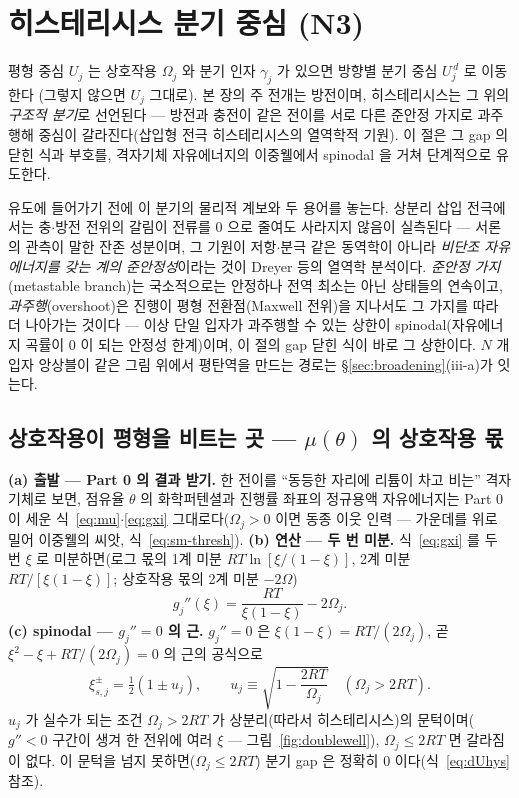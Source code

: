 \section{히스테리시스 분기 중심 (N3)}\label{sec:hys}
평형 중심 $U_j$ 는 상호작용 $\Omega_j$ 와 분기 인자 $\gamma_j$ 가 있으면 방향별 분기 중심 $U_j^{\,d}$ 로 이동한다
(그렇지 않으면 $U_j$ 그대로). 본 장의 주 전개는 방전이며, 히스테리시스는 그 위의 \emph{구조적 분기}로 선언된다 --- 방전과 충전이
같은 전이를 서로 다른 준안정 가지로 과주행해 중심이 갈라진다(삽입형 전극 히스테리시스의 열역학적 기원\cite{dreyer2010}).
이 절은 그 gap 의 닫힌 식과 부호를, 격자기체 자유에너지의
이중웰에서 spinodal 을 거쳐 단계적으로 유도한다.

유도에 들어가기 전에 이 분기의 물리적 계보와 두 용어를 놓는다. 상분리 삽입 전극에서는 충$\cdot$방전
전위의 갈림이 전류를 $0$ 으로 줄여도 사라지지 않음이 실측된다 --- 서론의 관측이 말한 잔존 성분이며, 그
기원이 저항$\cdot$분극 같은 동역학이 아니라 \emph{비단조 자유에너지를 갖는 계의 준안정성}이라는 것이
Dreyer 등의 열역학 분석이다\cite{dreyer2010,dreyer2011}. \emph{준안정 가지}(metastable branch)는
국소적으로는 안정하나 전역 최소는 아닌 상태들의 연속이고, \emph{과주행}(overshoot)은 진행이 평형
전환점(Maxwell 전위)을 지나서도 그 가지를 따라 더 나아가는 것이다 --- 이상 단일 입자가 과주행할 수 있는
상한이 spinodal(자유에너지 곡률이 $0$ 이 되는 안정성 한계)이며, 이 절의 gap 닫힌 식이 바로 그 상한이다.
$N$ 개 입자 앙상블이 같은 그림 위에서 평탄역을 만드는 경로는 \S\ref{sec:broadening}(iii-a)가 잇는다.

\subsection{상호작용이 평형을 비트는 곳 --- $\mu(\theta)$ 의 상호작용 몫}\label{sec:hys-spinodal}
\textbf{(a) 출발 --- Part 0 의 결과 받기.} 한 전이를 ``동등한 자리에 리튬이 차고 비는'' 격자기체로 보면,
점유율 $\theta$ 의 화학퍼텐셜과 진행률 좌표의 정규용액 자유에너지는 Part 0 이 세운
식~\eqref{eq:mu}$\cdot$\eqref{eq:gxi} 그대로다($\Omega_j>0$ 이면 동종 이웃 인력 --- 가운데를 위로 밀어
이중웰의 씨앗, 식~\eqref{eq:sm-thresh}). \textbf{(b) 연산 --- 두 번 미분.}
식~\eqref{eq:gxi} 를 두 번 $\xi$ 로 미분하면(로그 몫의 1계 미분 $RT\ln[\xi/(1-\xi)]$, 2계 미분
$RT/[\xi(1-\xi)]$; 상호작용 몫의 2계 미분 $-2\Omega$)
\begin{equation}
g_j''(\xi)=\frac{RT}{\xi(1-\xi)}-2\Omega_j.
\label{eq:gpp}
\end{equation}
\textbf{(c) spinodal --- $g_j''=0$ 의 근.} $g_j''=0$ 은 $\xi(1-\xi)=RT/(2\Omega_j)$, 곧 $\xi^2-\xi+RT/(2\Omega_j)=0$
의 근의 공식으로
\begin{equation}
\xi_{s,j}^\pm=\tfrac12(1\pm u_j),\qquad
u_j\equiv\sqrt{1-\frac{2RT}{\Omega_j}}\quad(\Omega_j>2RT).
\label{eq:spinodal}
\end{equation}
$u_j$ 가 실수가 되는 조건 $\Omega_j>2RT$ 가 상분리(따라서 히스테리시스)의 문턱이며($g''<0$ 구간이 생겨 한 전위에 여러
$\xi$ --- 그림~\ref{fig:doublewell}), $\Omega_j\le2RT$ 면 갈라짐이 없다. 이 문턱을 넘지 못하면($\Omega_j\le2RT$) 분기 gap 은 정확히 0 이다(식~\eqref{eq:dUhys} 참조).


